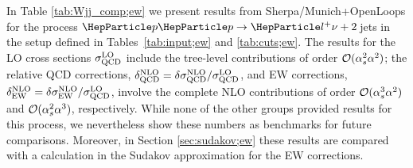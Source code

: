 \documentclass[11pt]{cernrep}
\begin{document}
In Table \ref{tab:Wjj_comp;ew} we present results from {\sc
  Sherpa/Munich+OpenLoops} for the process $\Pp\Pp\to
\Pl^+\nu+2$\,jets in the setup defined in Tables~\ref{tab:input;ew}
and \ref{tab:cuts;ew}.  The results for the LO cross sections
$\sigma^{\rm LO}_{\rm QCD}$ include the tree-level contributions of order
${\cal O}(\alpha_s^2\alpha^2)$; the relative QCD corrections, $\delta^{\rm
  NLO}_{\rm QCD} = \delta\sigma^{\rm NLO}_{\rm QCD}/\sigma^{\rm LO}_{\rm QCD}$,
and EW corrections, $\delta^{\rm NLO}_{\rm EW} = \delta\sigma^{\rm
  NLO}_{\rm EW}/\sigma^{\rm LO}_{\rm QCD}$, involve the complete NLO
contributions of order ${\cal O}(\alpha^3_s\alpha^2)$ and ${\cal
  O}(\alpha^2_s\alpha^3)$, respectively.  While none of the other
groups provided results for this process, we nevertheless show these
numbers as benchmarks for future comparisons. Moreover, in Section
\ref{sec:sudakov;ew} these results are compared with a calculation in
the Sudakov approximation for the EW corrections.





\end{document}
